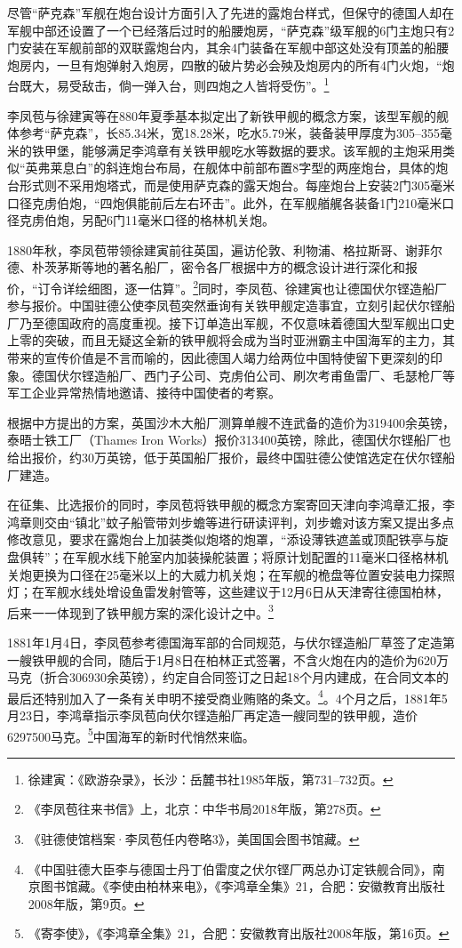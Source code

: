\documentclass[12pt,UTF8]{ctexbook}
\begin{document}
尽管“萨克森”军舰在炮台设计方面引入了先进的露炮台样式，但保守的德国人却在军舰中部还设置了一个已经落后过时的船腰炮房，“萨克森”级军舰的6门主炮只有2门安装在军舰前部的双联露炮台内，其余4门装备在军舰中部这处没有顶盖的船腰炮房内，一旦有炮弹射入炮房，四散的破片势必会殃及炮房内的所有4门火炮，“炮台既大，易受敌击，倘一弹入台，则四炮之人皆将受伤”。\footnote{徐建寅：《欧游杂录》，长沙：岳麓书社1985年版，第731--732页。}

李凤苞与徐建寅等在880年夏季基本拟定出了新铁甲舰的概念方案，该型军舰的舰体参考“萨克森”，长85.34米，宽18.28米，吃水5.79米，装备装甲厚度为305--355毫米的铁甲堡，能够满足李鸿章有关铁甲舰吃水等数据的要求。该军舰的主炮采用类似“英弗莱息白”的斜连炮台布局，在舰体中前部布置8字型的两座炮台，具体的炮台形式则不采用炮塔式，而是使用萨克森的露天炮台。每座炮台上安装2门305毫米口径克虏伯炮，“四炮俱能前后左右环击”。此外，在军舰艏艉各装备1门210毫米口径克虏伯炮，另配6门11毫米口径的格林机关炮。

1880年秋，李凤苞带领徐建寅前往英国，遍访伦敦、利物浦、格拉斯哥、谢菲尔德、朴茨茅斯等地的著名船厂，密令各厂根据中方的概念设计进行深化和报价，“订令详绘细图，逐一估算”。\footnote{《李凤苞往来书信》上，北京：中华书局2018年版，第278页。}同时，李凤苞、徐建寅也让德国伏尔铿造船厂参与报价。中国驻德公使李凤苞突然垂询有关铁甲舰定造事宜，立刻引起伏尔铿船厂乃至德国政府的高度重视。接下订单造出军舰，不仅意味着德国大型军舰出口史上零的突破，而且无疑这全新的铁甲舰将会成为当时亚洲霸主中国海军的主力，其带来的宣传价值是不言而喻的，因此德国人竭力给两位中国特使留下更深刻的印象。德国伏尔铿造船厂、西门子公司、克虏伯公司、刷次考甫鱼雷厂、毛瑟枪厂等军工企业异常热情地邀请、接待中国使者的考察。

根据中方提出的方案，英国沙木大船厂测算单艘不连武备的造价为319400余英镑，泰晤士铁工厂（Thames Iron Works）报价313400英镑，除此，德国伏尔铿船厂也给出报价，约30万英镑，低于英国船厂报价，最终中国驻德公使馆选定在伏尔铿船厂建造。

在征集、比选报价的同时，李凤苞将铁甲舰的概念方案寄回天津向李鸿章汇报，李鸿章则交由“镇北”蚊子船管带刘步蟾等进行研读评判，刘步蟾对该方案又提出多点修改意见，要求在露炮台上加装类似炮塔的炮罩，“添设薄铁遮盖或顶配铁亭与旋盘俱转”；在军舰水线下舱室内加装操舵装置；将原计划配置的11毫米口径格林机关炮更换为口径在25毫米以上的大威力机关炮；在军舰的桅盘等位置安装电力探照灯；在军舰水线处增设鱼雷发射管等，这些建议于12月6日从天津寄往德国柏林，后来一一体现到了铁甲舰方案的深化设计之中。\footnote{《驻德使馆档案·李凤苞任内卷略3》，美国国会图书馆藏。}

1881年1月4日，李凤苞参考德国海军部的合同规范，与伏尔铿造船厂草签了定造第一艘铁甲舰的合同，随后于1月8日在柏林正式签署，不含火炮在内的造价为620万马克（折合306930余英镑），约定自合同签订之日起18个月内建成，在合同文本的最后还特别加入了一条有关申明不接受商业贿赂的条文。\footnote{《中国驻德大臣李与德国士丹丁伯雷度之伏尔铿厂两总办订定铁舰合同》，南京图书馆藏。《李使由柏林来电》，《李鸿章全集》21，合肥：安徽教育出版社2008年版，第9页。}。4个月之后，1881年5月23日，李鸿章指示李凤苞向伏尔铿造船厂再定造一艘同型的铁甲舰，造价6297500马克。\footnote{《寄李使》，《李鸿章全集》21，合肥：安徽教育出版社2008年版，第16页。}中国海军的新时代悄然来临。
\end{document}
